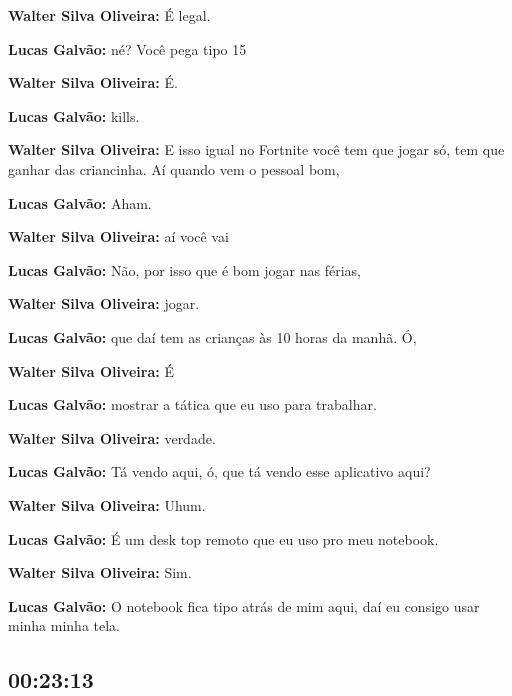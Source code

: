 \textbf{Walter Silva Oliveira:} É legal.



\textbf{Lucas Galvão:} né? Você pega tipo 15



\textbf{Walter Silva Oliveira:} É.



\textbf{Lucas Galvão:} kills.



\textbf{Walter Silva Oliveira:} E isso igual no Fortnite você tem que jogar só, tem que ganhar das criancinha. Aí quando vem o pessoal bom,



\textbf{Lucas Galvão:} Aham.



\textbf{Walter Silva Oliveira:} aí você vai



\textbf{Lucas Galvão:} Não, por isso que é bom jogar nas férias,



\textbf{Walter Silva Oliveira:} jogar.



\textbf{Lucas Galvão:} que daí tem as crianças às 10 horas da manhã. Ó,



\textbf{Walter Silva Oliveira:} É



\textbf{Lucas Galvão:} mostrar a tática que eu uso para trabalhar.



\textbf{Walter Silva Oliveira:} verdade.



\textbf{Lucas Galvão:} Tá vendo aqui, ó, que tá vendo esse aplicativo aqui?



\textbf{Walter Silva Oliveira:} Uhum.



\textbf{Lucas Galvão:} É um desk top remoto que eu uso pro meu notebook.



\textbf{Walter Silva Oliveira:} Sim.



\textbf{Lucas Galvão:} O notebook fica tipo atrás de mim aqui, daí eu consigo usar minha minha tela.



\subsection{\textbf{00:23:13}}



